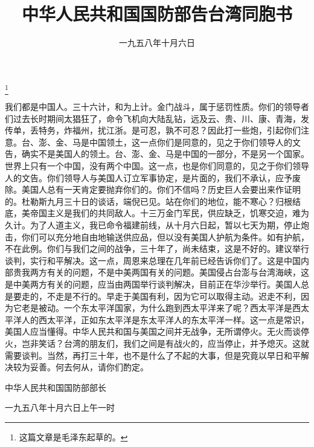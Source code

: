 
\title{中华人民共和国国防部告台湾同胞书}
\date{一九五八年十月六日}
\thanks{这篇文章是毛泽东起草的。}
\maketitle



我们都是中国人。三十六计，和为上计。金门战斗，属于惩罚性质。你们的领导者们过去长时期间太猖狂了，命令飞机向大陆乱钻，远及云、贵、川、康、青海，发传单，丢特务，炸福州，扰江浙。是可忍，孰不可忍？因此打一些炮，引起你们注意。台、澎、金、马是中国领土，这一点你们是同意的，见之于你们领导人的文告，确实不是美国人的领土。台、澎、金、马是中国的一部分，不是另一个国家。世界上只有一个中国，没有两个中国。这一点，也是你们同意的，见之于你们领导人的文告。你们领导人与美国人订立军事协定，是片面的，我们不承认，应予废除。美国人总有一天肯定要抛弃你们的。你们不信吗？历史巨人会要出来作证明的。杜勒斯九月三十日的谈话，端倪已见。站在你们的地位，能不寒心？归根结底，美帝国主义是我们的共同敌人。十三万金门军民，供应缺乏，饥寒交迫，难为久计。为了人道主义，我已命令福建前线，从十月六日起，暂以七天为期，停止炮击，你们可以充分地自由地输送供应品，但以没有美国人护航为条件。如有护航，不在此例。你们与我们之间的战争，三十年了，尚未结束，这是不好的。建议举行谈判，实行和平解决。这一点，周恩来总理在几年前已经告诉你们了。这是中国内部贵我两方有关的问题，不是中美两国有关的问题。美国侵占台澎与台湾海峡，这是中美两方有关的问题，应当由两国举行谈判解决，目前正在华沙举行。美国人总是要走的，不走是不行的。早走于美国有利，因为它可以取得主动。迟走不利，因为它老是被动。一个东太平洋国家，为什么跑到西太平洋来了呢？西太平洋是西太平洋人的西太平洋，正如东太平洋是东太平洋人的东太平洋一样。这一点是常识，美国人应当懂得。中华人民共和国与美国之间并无战争，无所谓停火。无火而谈停火，岂非笑话？台湾的朋友们，我们之间是有战火的，应当停止，并予熄灭。这就需要谈判。当然，再打三十年，也不是什么了不起的大事，但是究竟以早日和平解决较为妥善。何去何从，请你们酌定。

中华人民共和国国防部部长

一九五八年十月六日上午一时

